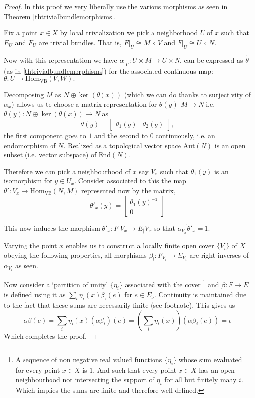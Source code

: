 \documentclass[12pt]{report}
\numberwithin{equation}{section}
\newcommand{\Hom}{{\mathrm{Hom}}}
\begin{document}
	\begin{proof}
		In this proof we very liberally use the various morphisms as seen in Theorem \ref{thtrivialbundlemorphisms}.
		
		Fix a point $x \in X$ by local trivialization we pick a neighborhood $U$ of $x$ such that $E_U$ and $F_U$ are trivial bundles. That is, $E|_U \cong M \times V$ and $F|_U \cong U \times N$.
		
		Now with this representation we have $\alpha|_U: U \times M \to U \times N$, can be expressed as $\tilde{\theta}$ (as in \ref{thtrivialbundlemorphisms}) for the associated continuous map:
		\(
		\theta: U \to \mathrm{Hom}_{\mathrm{VB}}(V, W).
		\)
		
		Decomposing $M$ as $N\oplus \ker (\theta (x))$ (which we can do thanks to surjectivity of $\alpha_x$) allows us to choose a matrix representation for $\theta(y):M\to N$ i.e. $\theta(y):N \oplus \ker (\theta( x)) \to N$ as
		\[
		\theta(y) = 
		\begin{bmatrix} 
			\theta_1(y) & \theta_2(y) 
		\end{bmatrix},
		\]
		the first component goes to \(1\) and the second to \( 0 \) continuously, i.e. an endomorphism of $N$. Realized as a topological vector space $\mathrm{Aut}(N)$ is an open subset (i.e. vector subspace) of $\mathrm{End}(N)$. 
		
		Therefore we can pick a neighbourhood of $x$ say $V_x$ such that $\theta_1(y)$ is an isomorphism for $y \in U_x$. Consider associated to this the map $\theta': V_x \to \Hom_{\mathrm{VB}}(N,M)$ represented now by the matrix,
		\[ \theta'_x(y)=\begin{bmatrix}
			\theta_1(y)^{-1}\\0
		\end{bmatrix} \]
		
		This now induces the morphism $\tilde{\theta}'_x: F_|{V_x} \to E_|{V_x}$ so that $\alpha_{V_x} \tilde{\theta}'_x = 1$. 
		
		Varying the point $x$ enables us to construct a locally finite open cover $\{V_i\}$ of $X$ obeying the following properties, all morphisms $\beta_i: F_{V_i} \to E_{V_i}$ are right inverses of $\alpha_{V_i}$ as seen.
		
		Now consider a `partition of unity' $\{ \eta_i\}$ associated with the cover \footnote{A sequence of non negative real valued functions $\{\eta_i \}$ whose sum evaluated for every point $x \in X$ is $1$. And such that every point $x\in X$ has an open neighbourhood not intersecting the support of $\eta_i $ for all but finitely many $i$. Which implies the sums are finite and therefore well defined.} and $\beta:F \to E$ is defined using it as $\sum_{i} \eta_i(x)\beta_i(e)$ for $e\in E_x$. Continuity is maintained due to the fact that these sums are necessarily finite (see footnote). This gives us \[ \alpha \beta (e)= \sum_i \eta_i(x) (\alpha \beta_i) (e) = \left(\sum_i \eta_i(x)\right) (\alpha \beta_i (e)) = e \]
		Which completes the proof.
	\end{proof}
	
\end{document}

